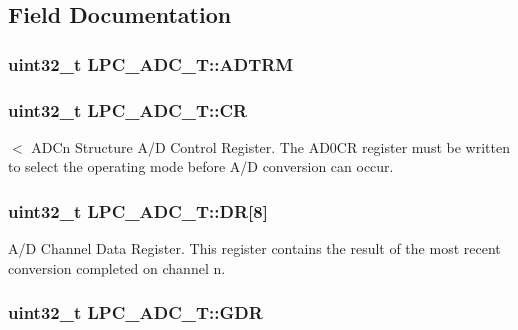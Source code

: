 \subsection{Field Documentation}
\hypertarget{structLPC__ADC__T_a22f04dd0b40c5a05707c0b1e43bd10bd}{
\subsubsection[{A\-D\-T\-R\-M}]{ uint32\-\_\-t L\-P\-C\-\_\-\-A\-D\-C\-\_\-\-T\-::\-A\-D\-T\-R\-M}}\label{structLPC__ADC__T_a22f04dd0b40c5a05707c0b1e43bd10bd}
\hypertarget{structLPC__ADC__T_a751f1cbdd3d5242aea596dc18113fedc}{
\subsubsection[{C\-R}]{ uint32\-\_\-t L\-P\-C\-\_\-\-A\-D\-C\-\_\-\-T\-::\-C\-R}}\label{structLPC__ADC__T_a751f1cbdd3d5242aea596dc18113fedc}
$<$ A\-D\-Cn Structure A/\-D Control Register. The A\-D0\-C\-R register must be written to select the operating mode before A/\-D conversion can occur. \hypertarget{structLPC__ADC__T_a10f521f172d10766bb189be671f8bd57}{
\subsubsection[{D\-R}]{ uint32\-\_\-t L\-P\-C\-\_\-\-A\-D\-C\-\_\-\-T\-::\-D\-R\mbox{[}8\mbox{]}}}\label{structLPC__ADC__T_a10f521f172d10766bb189be671f8bd57}
A/\-D Channel Data Register. This register contains the result of the most recent conversion completed on channel n. \hypertarget{structLPC__ADC__T_a063e42ec8fcdcf5590579a8d1a888ca0}{
\subsubsection[{G\-D\-R}]{ uint32\-\_\-t L\-P\-C\-\_\-\-A\-D\-C\-\_\-\-T\-::\-G\-D\-R}}\label{structLPC__ADC__T_a063e42ec8fcdcf5590579a8d1a888ca0}
